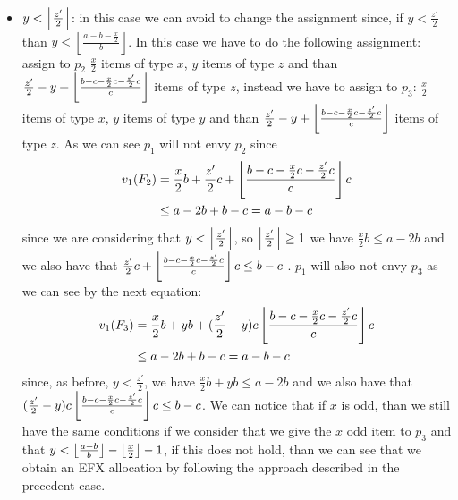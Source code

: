 \begin{itemize}
\begin{itemize}
\begin{itemize}
            \item $y < \left \lfloor\frac{z'}{2}\right \rfloor$: in this case we can avoid to change the assignment since, if $y< \frac{z'}{2}$ than $y < \left \lfloor \frac{a-b-\frac{x}{2}}{b}\right \rfloor$.
            In this case we have to do the following assignment: assign to $p_2$ $\frac{x}{2}$ items of type $x$, $y$ items of type $z$ and than $\frac{z'}{2}-y + \left \lfloor\frac{b-c-\frac{x}{2}c - \frac{z'}{2}c}{c}\right \rfloor$ items of type $z$, instead we have to assign to $p_3$: $\frac{x}{2}$ items of type $x$, $y$ items of type $y$ and than $\frac{z'}{2}-y + \left \lfloor\frac{b-c-\frac{x}{2}c - \frac{z'}{2}c}{c}\right \rfloor$ items of type $z$. As we can see $p_1$ will not envy $p_2$ since 
            \begin{align*}
                v_1(F_2) &= \frac{x}{2}b + \frac{z'}{2}c + \left \lfloor\frac{b-c-\frac{x}{2}c - \frac{z'}{2}c}{c}\right \rfloor c \\
                & \le a-2b + b - c = a- b - c
            \end{align*}    
            since we are considering that $y<\left \lfloor\frac{z'}{2}\right \rfloor$, so $\left \lfloor\frac{z'}{2}\right \rfloor \ge 1$ we have $ \frac{x}{2}b \le a-2b$ and we also have that $\frac{z'}{2}c + \left \lfloor\frac{b-c-\frac{x}{2}c - \frac{z'}{2}c}{c}\right \rfloor c \le b-c$ . 
            $p_1$ will also not envy $p_3$ as we can see by the next equation:
            \begin{align*}
                v_1(F_3) &= \frac{x}{2}b + yb + (\frac{z'}{2}-y)c \left \lfloor\frac{b-c-\frac{x}{2}c - \frac{z'}{2}c}{c}\right \rfloor c \\
                & \le a-2b + b - c = a- b - c
            \end{align*}
            since, as before,  $y<\frac{z'}{2}$, we have $\frac{x}{2}b + yb\le a-2b$ and we also have that $(\frac{z'}{2}-y)c \left \lfloor\frac{b-c-\frac{x}{2}c - \frac{z'}{2}c}{c}\right \rfloor c \le b-c$.
            We can notice that if $x$ is odd, than we still have the same conditions if we consider that we give the $x$ odd item to $p_3$ and that $y < \left \lfloor\frac{a-b}{b}\right \rfloor - \left \lfloor\frac{x}{2}\right \rfloor - 1$, if this does not hold, than we can see that we obtain an EFX allocation by following the approach described in the precedent case.
         \end{itemize}
         

\end{itemize}
\end{itemize}
